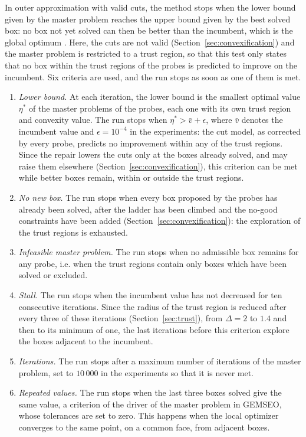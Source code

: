 \documentclass[pdflatex,sn-basic]{sn-jnl}
\begin{document}
In outer approximation with valid cuts, the method stops when the lower bound
given by the master problem reaches the upper bound given by the best solved
box: no box not yet solved can then be better than the incumbent, which is the
global optimum \citep{duran1986,fletcher1994}. Here, the cuts are not valid
(Section~\ref{sec:convexification}) and the master problem is restricted to a
trust region, so that this test only states that no box within the trust
regions of the probes is predicted to improve on the incumbent. Six criteria
are used, and the run stops as soon as one of them is met.
\begin{enumerate}
  \item \emph{Lower bound.} At each iteration, the lower bound is the smallest
    optimal value $\eta^\ast$ of the master problems of the probes, each one
    with its own trust region and convexity value. The run stops when
    $\eta^\ast > \bar v + \epsilon$, where $\bar v$ denotes the incumbent value
    and $\epsilon = 10^{-4}$ in the experiments: the cut model, as corrected by
    every probe, predicts no improvement within any of the trust regions. Since
    the repair lowers the cuts only at the boxes already solved, and may raise
    them elsewhere (Section~\ref{sec:convexification}), this criterion can be
    met while better boxes remain, within or outside the trust regions.
  \item \emph{No new box.} The run stops when every box proposed by the probes
    has already been solved, after the ladder has been climbed and the no-good
    constraints have been added (Section~\ref{sec:convexification}): the
    exploration of the trust regions is exhausted.
  \item \emph{Infeasible master problem.} The run stops when no admissible box
    remains for any probe, i.e. when the trust regions contain only boxes which
    have been solved or excluded.
  \item \emph{Stall.} The run stops when the incumbent value has not decreased
    for ten consecutive iterations. Since the radius of the trust region is
    reduced after every three of these iterations (Section~\ref{sec:trust}),
    from $\Delta = 2$ to $1.4$ and then to its minimum of one, the last
    iterations before this criterion explore the boxes adjacent to the
    incumbent.
  \item \emph{Iterations.} The run stops after a maximum number of iterations
    of the master problem, set to $10\,000$ in the experiments so that it is
    never met.
  \item \emph{Repeated values.} The run stops when the last three boxes solved
    give the same value, a criterion of the driver of the master problem in
    GEMSEO, whose tolerances are set to zero. This happens when the local
    optimizer converges to the same point, on a common face, from adjacent
    boxes.
\end{enumerate}
\end{document}
